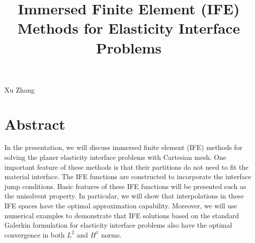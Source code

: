 \title{Immersed Finite Element (IFE) Methods for Elasticity Interface Problems}
\author{} \institute{}
\maketitle

\begin{center}
{\large Xu Zhang}
\end{center}

\section*{Abstract}
In the presentation, we will discuss immersed finite element (IFE) methods for solving the planer elasticity interface problems with Cartesian mesh. One important feature of these methods is that their partitions do not need to fit the material interface. The IFE functions are constructed to incorporate the interface jump conditions. Basic features of these IFE functions will be presented such as the unisolvent property. In particular, we will show that interpolations in these IFE spaces have the optimal approximation capability. Moreover, we will use numerical examples to demonstrate that IFE solutions based on the standard Galerkin formulation for elasticity interface problems also have the optimal convergence in both $L^2$ and $H^1$ norms.